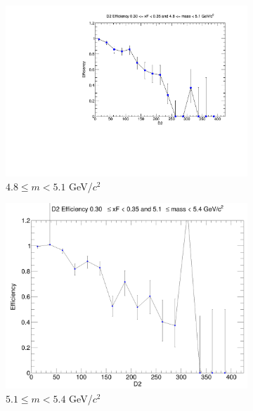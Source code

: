\begin{figure}[p]
\begin{subfigure}[b]{0.32\textwidth}
        \centering
        \includegraphics[width=\textwidth]{./kTrackerEfficiencyPlots/D2_Efficiency_xF6_mass2.pdf}
        \caption{$4.8 \leq m < 5.1$ GeV/$c^2$}
        \label{fig:xF6_mass2}
    \end{subfigure}
    \vspace{0.5cm}
    \begin{subfigure}[b]{0.32\textwidth}
        \centering
        \includegraphics[width=\textwidth]{./kTrackerEfficiencyPlots/D2_Efficiency_xF6_mass3.png}
        \caption{$5.1 \leq m < 5.4$ GeV/$c^2$}
        \label{fig:xF6_mass3}
    \end{subfigure}
    \hfill
    \begin{subfigure}[b]{0.32\textwidth}
        \centering

\end{subfigure}
\end{figure}
